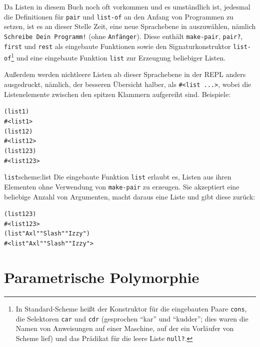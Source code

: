 Da Listen in diesem Buch noch oft vorkommen und es umständlich
ist, jedesmal die Definitionen für \texttt{pair} und \texttt{list-of} an den Anfang
von Programmen zu setzen, ist es an dieser Stelle Zeit, eine neue
Sprachebene in \drscheme{} auszuwählen, nämlich \texttt{Schreibe Dein Programm!}
(ohne \texttt{Anfänger}).  Diese enthält \texttt{make-pair},
\texttt{pair?}, \texttt{first} und \texttt{rest} als eingebaute
Funktionen sowie den Signaturkonstruktor \texttt{list-of}\footnote{In Standard-Scheme heißt der Konstruktor für
  die eingebauten Paare \texttt{cons}, die
  Selektoren \texttt{car} und \texttt{cdr}
  (gesprochen "`kar"' und "`kudder"'; dies waren die Namen von Anweisungen auf einer
  Maschine, auf der ein Vorläufer von Scheme lief) und das Prädikat
  für die leere Liste \texttt{null?}.} und eine
eingebaute Funktion \texttt{list} zur Erzeugung beliebiger Listen.

Außerdem werden nichtleere Listen ab dieser Sprachebene in der REPL
anders ausgedruckt, nämlich, der besseren Übersicht halber, als
\verb|#<list ...>|,
wobei die Listenelemente zwischen den spitzen Klammern aufgereiht sind.
Beispiele:

\begin{alltt}
(list 1)
\evalsto{} #<list 1>
(list 1 2)
\evalsto{} #<list 1 2>
(list 1 2 3)
\evalsto{} #<list 1 2 3>
\end{alltt}
%
\begin{feature}{\texttt{list}}{scheme:list}
  Die eingebaute Funktion \texttt{list} erlaubt es, Listen aus ihren Elementen
  ohne Verwendung von \texttt{make-pair} zu erzeugen.  Sie
  akzeptiert eine beliebige Anzahl von Argumenten, macht daraus eine
  Liste und gibt diese zurück:
%
\begin{alltt}
(list 1 2 3)
\evalsto{} #<list 1 2 3>
(list "Axl" "Slash" "Izzy")
\evalsto{} #<list "Axl" "Slash" "Izzy">
\end{alltt}
\end{feature}


\section{Parametrische Polymorphie}
\label{sec:parametric-polymorphism}
\label{sec:more-lists}

